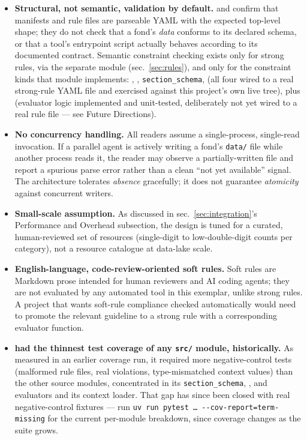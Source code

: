 \documentclass[
]{article}
\providecommand{\tightlist}{%
  \setlength{\itemsep}{0pt}\setlength{\parskip}{0pt}}
\begin{document}
\begin{itemize}
\tightlist
\item
  \textbf{Structural, not semantic, validation by default.}
   and 
  confirm that manifests and rule files are parseable YAML with the
  expected top-level shape; they do not check that a fond's \emph{data}
  conforms to its declared schema, or that a tool's entrypoint script
  actually behaves according to its documented contract. Semantic
  constraint checking exists only for strong rules, via the separate
   module (sec.~\ref{sec:rules}), and
  only for the constraint kinds that module implements:
  , ,
  \texttt{section\_schema},  (all four wired
  to a real strong-rule YAML file and exercised against this project's
  own live tree), plus  (evaluator logic
  implemented and unit-tested, deliberately not yet wired to a real rule
  file --- see Future Directions).
\item
  \textbf{No concurrency handling.} All readers assume a single-process,
  single-read invocation. If a parallel agent is actively writing a
  fond's \texttt{data/} file while another process reads it, the reader
  may observe a partially-written file and report a spurious parse error
  rather than a clean ``not yet available'' signal. The architecture
  tolerates \emph{absence} gracefully; it does not guarantee
  \emph{atomicity} against concurrent writers.
\item
  \textbf{Small-scale assumption.} As discussed in
  sec.~\ref{sec:integration}'s Performance and Overhead subsection, the
  design is tuned for a curated, human-reviewed set of resources
  (single-digit to low-double-digit counts per category), not a resource
  catalogue at data-lake scale.
\item
  \textbf{English-language, code-review-oriented soft rules.} Soft rules
  are Markdown prose intended for human reviewers and AI coding agents;
  they are not evaluated by any automated tool in this exemplar, unlike
  strong rules. A project that wants soft-rule compliance checked
  automatically would need to promote the relevant guideline to a strong
  rule with a corresponding evaluator function.
\item
  \textbf{ had the thinnest test
  coverage of any \texttt{src/} module, historically.} As measured in an
  earlier coverage run, it required more negative-control tests
  (malformed rule files, real violations, type-mismatched context
  values) than the other source modules, concentrated in its
  \texttt{section\_schema}, , and
   evaluators and its context loader. That gap
  has since been closed with real negative-control fixtures --- run
  \texttt{uv\ run\ pytest\ …\ -\/-cov-report=term-missing} for the
  current per-module breakdown, since coverage changes as the suite
  grows.
\end{itemize}
\end{document}
